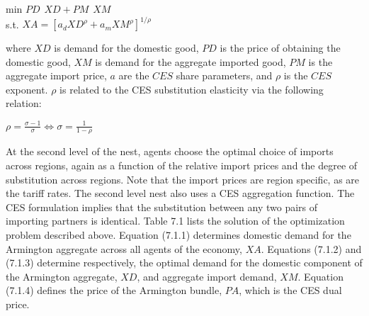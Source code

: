 \documentclass[12pt]{article}
\begin{document}
\begin{center}

min \hspace{30pt} $PD \hspace{5pt} XD + PM \hspace{5pt} XM$\\[20pt]
s.t. \hspace{5pt} $XA = \left[a_dXD^\rho + a_mXM^\rho\right]^{1/\rho}$

\end{center}

where $XD$ is demand for the domestic good, $PD$ is the price of obtaining the domestic good, $XM$ is demand for the aggregate imported good, $PM$ is the aggregate import price, $a$ are the $CES$ share parameters, and $\rho$ is the $CES$ exponent. $\rho$ is related to the CES substitution elasticity via the following relation:

\begin{center}

$\rho = \frac{\sigma - 1}{\sigma} \Longleftrightarrow \sigma = \frac{1}{1-\rho}$

\end{center}

At the second level of the nest, agents choose the optimal choice of imports across regions, again as a function of the relative import prices and the degree of substitution across regions. Note that the import prices are region specific, as are the tariff rates. The second level nest also uses a CES aggregation function. The CES formulation implies that the substitution between any two pairs of importing partners is identical. Table 7.1 lists the solution of the optimization problem described above. Equation (7.1.1) determines domestic demand for the Armington aggregate across all agents of the economy, $XA$. Equations (7.1.2) and (7.1.3) determine respectively, the optimal demand for the domestic component of the Armington aggregate, $XD$, and aggregate import demand, $XM$. Equation (7.1.4) defines the price of the Armington bundle, $PA$, which is the CES dual price.

\newpage
\end{document}
